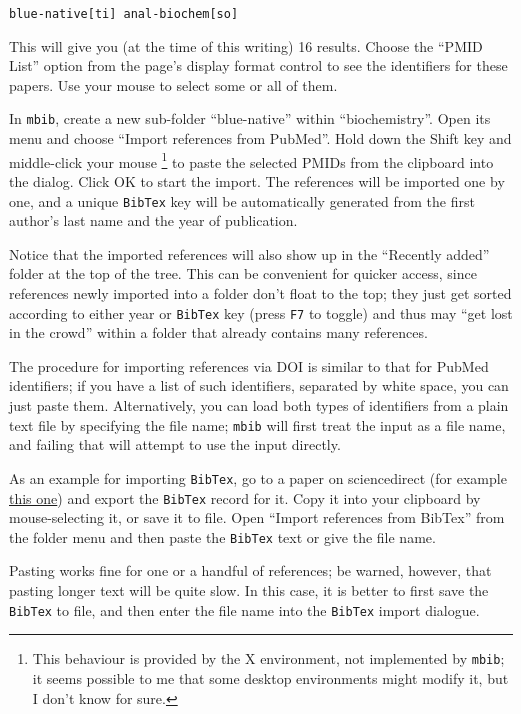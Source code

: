 \documentclass[10pt]{article}
\newcommand*{\mbib}{\texttt{mbib}\xspace}
\newcommand*{\bibtex}{\texttt{BibTex}\xspace}
\newcommand*{\key}[1]{\texttt{#1}\xspace}
\begin{document}
\begin{verbatim}
blue-native[ti] anal-biochem[so]
\end{verbatim}

\noindent This will give you (at the time of this writing) 16 results. Choose the ``PMID List'' option from the page's display format control to see the identifiers for these papers. Use your mouse to select some or all of them. 

In \mbib, create a new sub-folder ``blue-native'' within ``biochemistry''. Open its menu and choose ``Import references from PubMed''. Hold down the Shift key and middle-click your mouse%
%
\footnote{This behaviour is provided by the X environment, not implemented by \mbib; it seems possible to me that some desktop environments might modify it, but I don't know for sure.}
%
to paste the selected PMIDs from the clipboard into the dialog. Click OK to start the import. The references will be imported one by one, and a unique \bibtex key will be automatically generated from the first author's last name and the year of publication. 

Notice that the imported references will also show up in the ``Recently added'' folder at the top of the tree. This can be convenient for quicker access, since references newly imported into a folder don't float to the top; they just get sorted according to either year or \bibtex key (press \key{F7} to toggle) and thus may ``get lost in the crowd'' within a folder that already contains many references.

The procedure for importing references via DOI is similar to that for PubMed identifiers; if you have a list of such identifiers, separated by white space, you can just paste them. Alternatively, you can load both types of identifiers from a plain text file by specifying the file name; \mbib will first treat the input as a file name, and failing that will attempt to use the input directly. 
 
As an example for importing \bibtex, go to a paper on 
sciencedirect (for example \href{https://doi.org/10.1016/j.bbamem.2014.05.014}{this one}) and export the \bibtex record for it. Copy it into your clipboard by mouse-selecting it, or save it to file. Open ``Import references from BibTex'' from the folder menu and then paste the \bibtex text or give the file name. 

Pasting works fine for one or a handful of references;  be warned, however, that pasting longer text will be quite slow. In this case, it is better to first save the \bibtex to file, and then enter the file name into the \bibtex import dialogue. 
\end{document}
